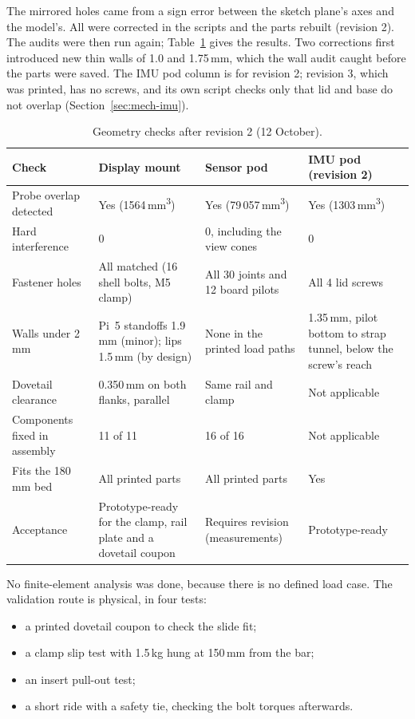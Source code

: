 The mirrored holes came from a sign error between the sketch plane's axes and the model's. All were corrected in the scripts and the parts rebuilt (revision 2). The audits were then run again; Table~\ref{tab:mech-verification} gives the results. Two corrections first introduced new thin walls of 1.0 and 1.75\,mm, which the wall audit caught before the parts were saved. The IMU pod column is for revision 2; revision 3, which was printed, has no screws, and its own script checks only that lid and base do not overlap (Section~\ref{sec:mech-imu}).

\begin{table}[htbp]
\centering
\caption[Geometry checks after revision 2 (12 October)]{Geometry checks after revision 2 (12 October).}
\label{tab:mech-verification}
\small
\begin{tabular}{|p{3.0cm}|p{3.8cm}|p{3.8cm}|p{3.8cm}|}
\hline
\textbf{Check} & \textbf{Display mount} & \textbf{Sensor pod} & \textbf{IMU pod (revision 2)} \\ \hline
Probe overlap detected & Yes (1564\,mm\textsuperscript{3}) & Yes (79\,057\,mm\textsuperscript{3}) & Yes (1303\,mm\textsuperscript{3}) \\ \hline
Hard interference & 0 & 0, including the view cones & 0 \\ \hline
Fastener holes & All matched (16 shell bolts, M5 clamp) & All 30 joints and 12 board pilots & All 4 lid screws \\ \hline
Walls under 2\,mm & Pi~5 standoffs 1.9\,mm (minor); lips 1.5\,mm (by design) & None in the printed load paths & 1.35\,mm, pilot bottom to strap tunnel, below the screw's reach \\ \hline
Dovetail clearance & 0.350\,mm on both flanks, parallel & Same rail and clamp & Not applicable \\ \hline
Components fixed in assembly & 11 of 11 & 16 of 16 & Not applicable \\ \hline
Fits the 180\,mm bed & All printed parts & All printed parts & Yes \\ \hline
Acceptance & Prototype-ready for the clamp, rail plate and a dovetail coupon & Requires revision (measurements) & Prototype-ready \\ \hline
\end{tabular}
\end{table}

No finite-element analysis was done, because there is no defined load case. The validation route is physical, in four tests:
\begin{itemize}
\item a printed dovetail coupon to check the slide fit;
\item a clamp slip test with 1.5\,kg hung at 150\,mm from the bar;
\item an insert pull-out test;
\item a short ride with a safety tie, checking the bolt torques afterwards.
\end{itemize}

